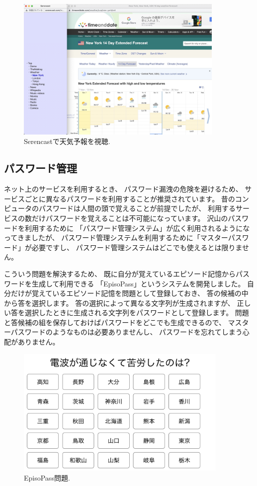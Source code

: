 \documentclass[topics]{compsoft} %
\begin{document}
\begin{figure}[t]
  \includegraphics[width=10cm,bb=0 0 2510 1746]{figures/bb4027e2e210bc16450f0120a2987458.jpg}
  \caption{Serencastで天気予報を視聴.}
  \label{serencast}
\end{figure}

\subsection{パスワード管理}

ネット上のサービスを利用するとき、
パスワード漏洩の危険を避けるため、
サービスごとに異なるパスワードを利用することが推奨されています。
%
昔のコンピュータのパスワードは人間の頭で覚えることが前提でしたが、
利用するサービスの数だけパスワードを覚えることは不可能になっています。
%
沢山のパスワードを利用するために
「パスワード管理システム」が広く利用されるようになってきましたが、
パスワード管理システムを利用するために「マスターパスワード」が必要ですし、
パスワード管理システムはどこでも使えるとは限りません。

こういう問題を解決するため、
既に自分が覚えているエピソード記憶からパスワードを生成して利用できる
「EpisoPass」というシステムを開発しました\cite{episopass1}\cite{episopass2}。
自分だけが覚えているエピソード記憶を問題として登録しておき、
答の候補の中から答を選択します。
答の選択によって異なる文字列が生成されますが、
正しい答を選択したときに生成される文字列をパスワードとして登録します。
問題と答候補の組を保存しておけばパスワードをどこでも生成できるので、
マスターパスワードのようなものは必要ありませんし、
パスワードを忘れてしまう心配がありません。

\begin{figure}[t]
  \includegraphics[width=10.2cm,bb=0 0 2418 1480]{figures/e5c3cabfe3011ef807b5e045c2d83ea8.png}
  \caption{EpisoPass問題.}
  \label{episopass}
\end{figure}
\end{document}
